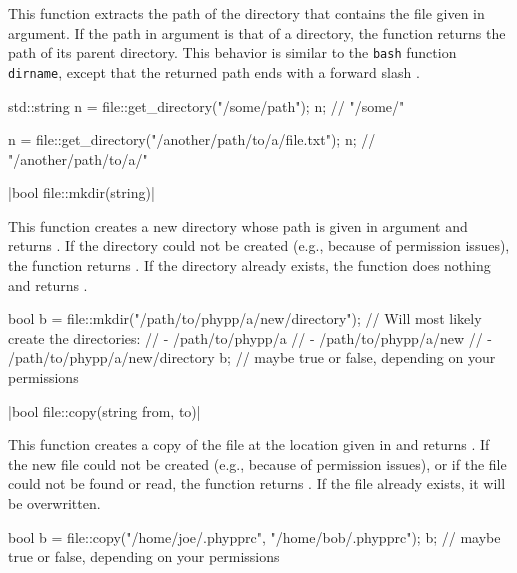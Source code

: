 This function extracts the path of the directory that contains the file given in argument. If the path in argument is that of a directory, the function returns the path of its parent directory. This behavior is similar to the \texttt{bash} function \texttt{dirname}, except that the returned path ends with a forward slash \cppinline{/}.

\begin{example}
\begin{cppcode}
std::string n = file::get_directory("/some/path");
n; // "/some/"

n = file::get_directory("/another/path/to/a/file.txt");
n; // "/another/path/to/a/"
\end{cppcode}
\end{example}

\funcitem \vectorfunc \cppinline|bool file::mkdir(string)| 

This function creates a new directory whose path is given in argument and returns \cpptrue. If the directory could not be created (e.g., because of permission issues), the function returns \cppfalse. If the directory already exists, the function does nothing and returns \cpptrue.

\begin{example}
\begin{cppcode}
bool b = file::mkdir("/path/to/phypp/a/new/directory");
// Will most likely create the directories:
//  - /path/to/phypp/a
//  - /path/to/phypp/a/new
//  - /path/to/phypp/a/new/directory
b; // maybe true or false, depending on your permissions
\end{cppcode}
\end{example}

\funcitem \cppinline|bool file::copy(string from, to)| 

This function creates a copy of the file  at the location given in  and returns \cpptrue. If the new file could not be created (e.g., because of permission issues), or if the file  could not be found or read, the function returns \cppfalse. If the file  already exists, it will be overwritten.

\begin{example}
\begin{cppcode}
bool b = file::copy("/home/joe/.phypprc", "/home/bob/.phypprc");
b; // maybe true or false, depending on your permissions
\end{cppcode}
\end{example}

